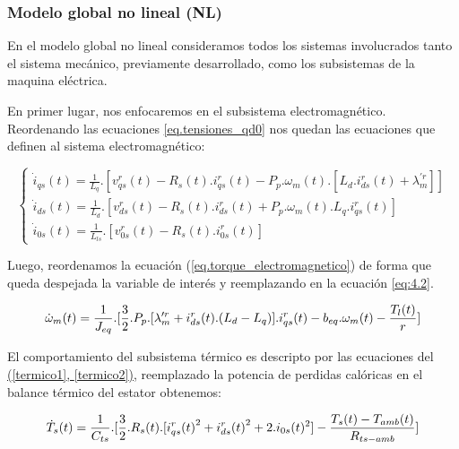 \documentclass{article}
\begin{document}
\subsubsection{Modelo global no lineal (NL)}

En el modelo global no lineal consideramos todos los sistemas involucrados 
tanto el sistema mecánico, previamente desarrollado, como los subsistemas de la maquina eléctrica.

En primer lugar, nos enfocaremos en el subsistema electromagnético. Reordenando las ecuaciones \ref{eq.tensiones_qd0}
nos quedan las ecuaciones que definen al sistema electromagnético:

\begin{equation}\label{eq:mi_ecuacion}
    \begin{cases}
        \dot{i}_{qs}(t) = \frac{1}{L_{q}}.[v_{qs}^r(t) - R_{s}(t).i_{qs}^r(t) - P_{p}.\omega_{m}(t).[L_{d}.i_{ds}^r(t) + \lambda_{m}^{\prime r}]]  \\
        \dot{i}_{ds}(t) = \frac{1}{L_{d}}.[v_{ds}^r(t) - R_{s}(t).i_{ds}^r(t) + P_{p}.\omega_{m}(t).L_{q}.i_{qs}^r(t)]  \\
        \dot{i}_{0s}(t) = \frac{1}{L_{ls}}.[v_{0s}^r(t) - R_{s}(t).i_{0s}^r(t)]
    \end{cases}
\end{equation}

Luego, reordenamos la ecuación (\ref{eq.torque_electromagnetico}) de forma que queda despejada la variable de interés y reemplazando en la ecuación \ref{eq:4.2}.

\begin{equation}\label{eq.torque_electromagnetico_reordenado}
    \dot{\omega}_{m}(t) = \frac{1}{J_{eq}}.[\frac{3}{2}.P_{p}.[\lambda_{m}^{\prime r}+i_{ds}^r(t).(L_{d}-L_{q})].i_{qs}^r(t) - b_{eq}.\omega_{m}(t) - \frac{T_{l}(t)}{r}]\\
\end{equation}

El comportamiento del subsistema térmico es descripto por las ecuaciones del
\hyperref[termico1, termico2]{(\ref*{termico1}, \ref*{termico2})}, reemplazado la potencia de perdidas calóricas en el balance térmico del estator
obtenemos:

\begin{equation}\label{termico3}
    \dot{T}_{s}(t) = \frac{1}{C_{ts}}.[\frac{3}{2}.R_{s}(t).[{i_{qs}^r(t)}^2+{i_{ds}^r(t)}^2 + 2.i_{0s}(t)^2] - \frac{T_{s}(t)-T_{amb}(t)}{R_{ts-amb}}]\\
\end{equation}
\end{document}
